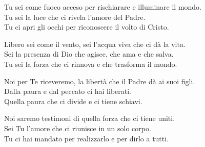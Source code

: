

\spazio

\strofa Tu sei come fuoco acceso per rischiarare e illuminare il mondo.\\
Tu sei la luce che ci rivela l'amore del Padre.\\
Tu ci apri gli occhi per riconoscere il volto di Cristo.

\spazio


\spazio

\strofa Libero sei come il vento, sei l'acqua viva che ci dà la vita.\\
Sei la presenza di Dio che agisce, che ama e che salva.\\
Tu sei la forza che ci rinnova e che trasforma il mondo.

\spazio


\spazio

\strofa Noi per Te riceveremo, la libertà che il Padre dà ai suoi figli.\\
Dalla paura e dal peccato ci hai liberati.\\
Quella paura che ci divide e ci tiene schiavi.

\spazio


\spazio

\strofa Noi saremo testimoni di quella forza che ci tiene uniti.\\
Sei Tu l'amore che ci riunisce in un solo corpo.\\
Tu ci hai mandato per realizzarlo e per dirlo a tutti.

\spazio


